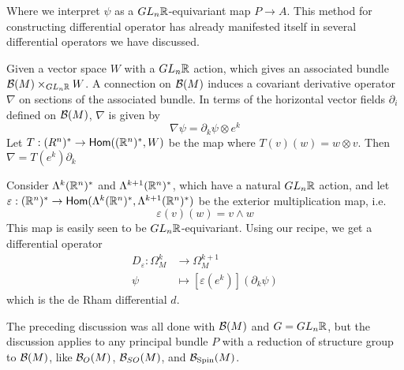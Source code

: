 Where we interpret $\psi$ as a $GL_n\mathbb{R}$-equivariant map $P \to A$.
%
This method for constructing differential operator has already manifested itself
in several differential operators we have discussed.
%
\begin{exmp}
 Given a vector space $W$ with a $GL_n\mathbb{R}$ action, which gives an associated
 bundle $\mathcal{B}(M) \times_{GL_n\mathbb{R}} W$. A connection on $\mathcal{B}(M)$ induces a
 covariant derivative operator $\nabla$ on sections of the associated bundle.
 In terms of the horizontal vector
 fields $\partial_i$ defined on $\mathcal{B}(M)$, $\nabla$ is given by
 \[
  \nabla\psi = \partial_k\psi \otimes e^k
 \]
 Let $T : (R^n)^* \to \mathsf{Hom}((\mathbb{R}^n)^*, W)$ be the map where $T(v)(w) = w \otimes v$.
 Then $\nabla = T(e^k)\partial_k$
\end{exmp}
%
\begin{exmp}
 Consider $\Lambda^k(\mathbb{R}^n)^*$ and $\Lambda^{k+1}(\mathbb{R}^n)^*$, which have a natural
 $GL_n\mathbb{R}$ action, and let
 $\varepsilon : (\mathbb{R}^n)^* \to \mathsf{Hom}(\Lambda^k(\mathbb{R}^n)^*,\Lambda^{k+1}(\mathbb{R}^n)^*)$
 be the exterior multiplication map, i.e.
 \[
  \varepsilon(v)(w) = v \wedge w
 \]
 This map is easily seen to be $GL_n\mathbb{R}$-equivariant. Using our recipe, we get a
 differential operator
 \begin{align*}
  D_\varepsilon : \Omega^k_M & \to \Omega^{k+1}_M                         \\
  \psi                       & \mapsto [\varepsilon(e^k)](\partial_k\psi)
 \end{align*}
 which is the de Rham differential $d$.
\end{exmp}
%
The preceding discussion was all done with $\mathcal{B}(M)$ and $G = GL_n\mathbb{R}$, but the
discussion applies to any principal bundle $P$ with a reduction of structure
group to $\mathcal{B}(M)$, like $\mathcal{B}_O(M)$, $\mathcal{B}_{SO}(M)$, and $\mathcal{B}_{\mathrm{Spin}}(M)$. \\
%

